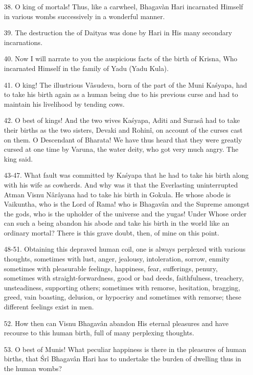 38. O king of mortals! Thus, like a carwheel, Bhagavàn Hari incarnated Himself in various wombs successively in a wonderful manner.

39. The destruction the of Daityas was done by Hari in His many secondary incarnations.

40. Now I will narrate to you the auspicious facts of the birth of Krisna, Who incarnated Himself in the family of Yadu (Yadu Kula).

41. O king! The illustrious V\^asudeva, born of the part of the Muni Ka\'syapa, had to take his birth again as a human being due to his previous curse and had to maintain his livelihood by tending cows.

42. O best of kings! And the two wives Ka\'syapa, Aditi and Suras\^a had to take their births as the two sisters, Devaki and Rohin\^i, on account of the curses cast on them. O Descendant of Bharata! We have thus heard that they were greatly cursed at one time by Varuna, the water deity, who got very much angry. The king said.

43-47. What fault was committed by Ka\'syapa that he had to take his birth along with his wife as cowherds. And why was it that the Everlasting uninterrupted Atman Visnu N\^ar\^ayana had to take his birth in Gokula. He whose abode is Vaikuntha, who is the Lord of Rama! who is Bhagav\^an and the Supreme amongst the gods, who is the upholder of the universe and the yugas! Under Whose order can such a being abandon his abode and take his birth in the world like an ordinary mortal? There is this grave doubt, then, of mine on this point.

48-51. Obtaining this depraved human coil, one is always perplexed with various thoughts, sometimes with lust, anger, jealousy, intoleration, sorrow, enmity sometimes with pleasurable feelings, happiness, fear, sufferings, penury, sometimes with straight-forwardness, good or bad deeds, faithfulness, treachery, unsteadiness, supporting others; sometimes with remorse, hesitation, bragging, greed, vain boasting, delusion, or hypocrisy and sometimes with remorse; these different feelings exist in men.

52. How then can Visnu Bhagav\^an abandon His eternal pleasures and have recourse to this human birth, full of many perplexing thoughts.

53. O best of Munis! What peculiar happiness is there in the pleasures of human births, that \'Sr\^i Bhagav\^an Hari has to undertake the burden of dwelling thus in the human wombs?

